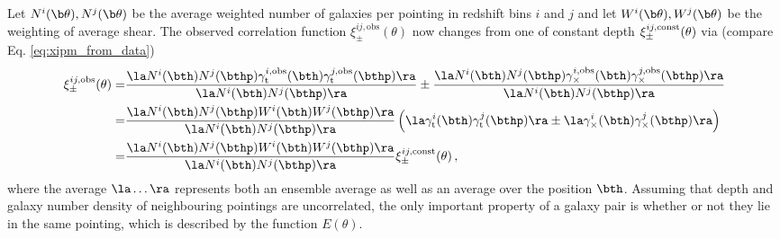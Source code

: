 Let $N^i(\b \theta),N^j(\b\theta)$ be the average weighted number of galaxies per pointing in redshift bins $i$ and $j$ and let $W^i(\b \theta),W^j(\b\theta)$ be the weighting of average shear. The observed correlation function $\xi^{ij,\text{obs}}_\pm(\theta)$ now changes from one of constant depth $\xi_\pm^{ij,\rm{const}}(\theta)$ via (compare Eq. \ref{eq:xipm_from_data})
\begin{align}
\xi^{ij,\text{obs}}_\pm(\theta) = & \frac{\la N^i(\bth)N^j(\bthp)\gamma^{i,\rm{obs}}_{\rm t}(\bth)\gamma^{j,\rm{obs}}_{\rm t}(\bthp)\ra }{\la N^i(\bth)N^j(\bthp)\ra} \pm \frac{\la N^i(\bth)N^j(\bthp)\gamma^{i,\rm{obs}}_\times(\bth)\gamma^{j,\rm{obs}}_\times(\bthp)\ra }{\la N^i(\bth)N^j(\bthp)\ra} \nonumber\\
 = & \frac{\la N^i(\bth)N^j(\bthp)W^i(\bth)W^j(\bthp)\ra}{\la N^i(\bth)N^j(\bthp)\ra}\left( \la \gamma^i_{\rm t}(\bth)\gamma^j_{\rm t}(\bthp)\ra \pm \la \gamma^i_\times(\bth)\gamma^j_\times(\bthp)\ra \right) \nonumber\\
 = & \frac{\la N^i(\bth)N^j(\bthp)W^i(\bth)W^j(\bthp)\ra}{\la N^i(\bth)N^j(\bthp)\ra} \xi_{\pm}^{ij,\rm{const}}(\theta) \, ,
 \label{eq:xipmblub1}
 \end{align}
 where the average $\la\ldots\ra$ represents both an ensemble average as well as an average over the position $\bth$.
 Assuming that depth and galaxy number density of neighbouring pointings are uncorrelated, the only important property of a galaxy pair is whether or not they lie in the same pointing, which is described by the function $E(\theta)$.

